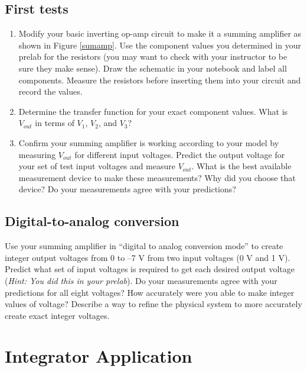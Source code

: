 \documentclass[10pt]{PhysLab1C} %
\begin{document}
\subsection{First tests}


\begin{enumerate}
\def\labelenumi{\arabic{enumi}.}
\item
  Modify your basic inverting op-amp circuit to make it a summing
  amplifier as shown in Figure \ref{sumamp}. Use the component values you determined
  in your prelab for the resistors (you may want to check with your
  instructor to be sure they make sense). Draw the schematic in your
  notebook and label all components. Measure the resistors before
  inserting them into your circuit and record the values.
\item
  Determine the transfer function for your exact component values. What
  is \(V_{out}\) in terms of \(V_1\), \(V_2\), and \(V_3\)?
\item
  Confirm your summing amplifier is working according to your model by
  measuring \(V_{out}\) for different input voltages. Predict the output
  voltage for your set of test input voltages and measure \(V_{out}\).
  What is the best available measurement device to make these
  measurements? Why did you choose that device? Do your measurements
  agree with your predictions?
\end{enumerate}

\subsection{Digital-to-analog conversion}



Use your summing amplifier in ``digital to analog conversion mode'' to
create integer output voltages from 0 to --7 V from two input voltages
(0 V and 1 V). Predict what set of input voltages is required to get
each desired output voltage (\emph{Hint: You did this in your prelab}). Do your measurements agree with your predictions for all eight
voltages? How accurately were you able to make integer values of
voltage? Describe a way to refine the physical system to more accurately
create exact integer voltages.



\section{Integrator Application}
\end{document}

